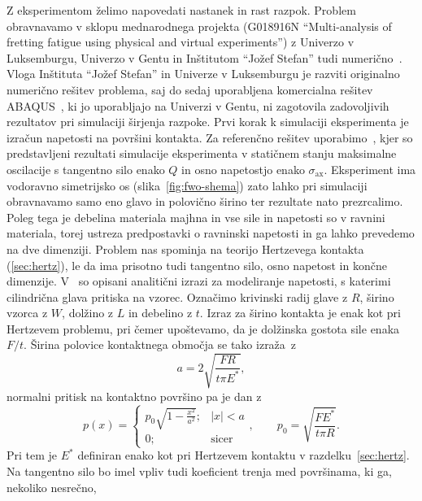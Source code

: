 \documentclass[12pt,a4paper,twoside]{article}
\theoremstyle{definition} %
\theoremstyle{plain} %
\numberwithin{equation}{section}
\newcommand{\sax}{\ensuremath{\sigma_{\text{ax}}}}
\begin{document}
Z eksperimentom želimo napovedati nastanek in rast razpok. Problem obravnavamo v sklopu mednarodnega
projekta (G018916N ``Multi-analysis of fretting fatigue using physical and virtual experiments'') z
Univerzo v Luksemburgu, Univerzo v Gentu in Inštitutom ``Jožef Stefan''  tudi
numerično~\cite{pereira2016convergence}. Vloga Inštituta ``Jožef Stefan'' in Univerze v Luksemburgu
je razviti originalno numerično rešitev problema, saj do sedaj uporabljena komercialna rešitev
ABAQUS\textregistered~\cite{hibbitt2001abaqus}, ki jo uporabljajo na Univerzi v Gentu, ni zagotovila
zadovoljivih rezultatov pri simulaciji širjenja razpoke. Prvi korak k simulaciji eksperimenta je
izračun napetosti na površini kontakta. Za referenčno rešitev
uporabimo~\cite{pereira2016convergence}, kjer so predstavljeni rezultati simulacije eksperimenta v
statičnem stanju maksimalne oscilacije s tangentno silo enako $Q$ in osno napetostjo enako $\sax$.
Eksperiment ima vodoravno simetrijsko os (slika~\ref{fig:fwo-shema}) zato lahko pri simulaciji
obravnavamo samo eno glavo in polovično širino ter rezultate nato prezrcalimo. Poleg tega je
debelina materiala majhna in vse sile in napetosti so v ravnini materiala, torej ustreza
predpostavki o ravninski napetosti in ga lahko prevedemo na dve dimenziji. Problem nas spominja na
teorijo Hertzevega kontakta (\ref{sec:hertz}), le da ima prisotno tudi tangentno silo, osno napetost
in končne dimenzije. V~\cite[razdelek 2]{pereira2016convergence} so opisani analitični izrazi za
modeliranje napetosti, s katerimi cilindrična glava pritiska na vzorec. Označimo krivinski radij
glave z $R$, širino vzorca z $W$, dolžino z $L$ in debelino z $t$. Izraz za širino kontakta je enak
kot pri Hertzevem problemu, pri čemer upoštevamo, da je dolžinska gostota sile enaka $F/t$. Širina
polovice kontaktnega območja se tako izraža~z
\begin{equation}
   a = 2\sqrt{\frac{FR}{t \pi E^\ast}},
\end{equation}
normalni pritisk na kontaktno površino pa je dan z
\begin{equation}
  p(x) = \begin{cases}
    p_0 \sqrt{1-\frac{x^2}{a^2}}; & |x| < a \\
    0; & \text{sicer}
  \end{cases}, \qquad p_0 = \sqrt{\frac{FE^\ast}{t \pi R}}.
\end{equation}
Pri tem je $E^\ast$ definiran enako kot pri Hertzevem kontaktu v razdelku~\ref{sec:hertz}.
Na tangentno silo bo imel vpliv tudi koeficient trenja med površinama, ki ga, nekoliko nesrečno,
\end{document}
